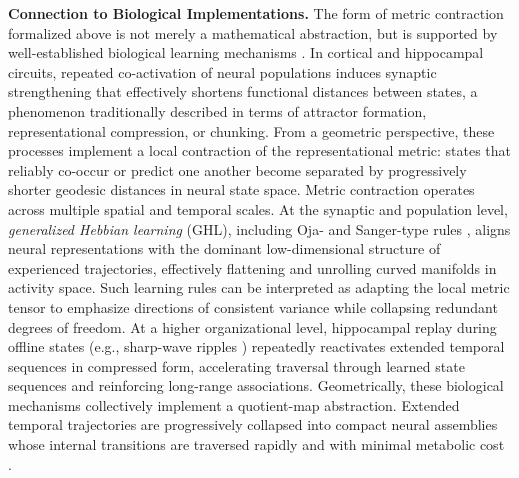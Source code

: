 \documentclass{article}
\begin{document}
\noindent\textbf{Connection to Biological Implementations.}
The form of metric contraction formalized above is not merely a mathematical abstraction, but is supported by well-established biological learning mechanisms \cite{muller1996hippocampus,buzsaki2013memory}.
In cortical and hippocampal circuits, repeated co-activation of neural populations induces synaptic strengthening that effectively shortens functional distances between states, a phenomenon traditionally described in terms of attractor formation, representational compression, or chunking.
From a geometric perspective, these processes implement a local contraction of the representational metric: states that reliably co-occur or predict one another become separated by progressively shorter geodesic distances in neural state space.
Metric contraction operates across multiple spatial and temporal scales.
At the synaptic and population level, \emph{generalized Hebbian learning} (GHL), including Oja- and Sanger-type rules \cite{oja1982simplified,sanger1989optimal}, aligns neural representations with the dominant low-dimensional structure of experienced trajectories, effectively flattening and unrolling curved manifolds in activity space.
Such learning rules can be interpreted as adapting the local metric tensor to emphasize directions of consistent variance while collapsing redundant degrees of freedom.
At a higher organizational level, hippocampal replay during offline states (e.g., sharp-wave ripples \cite{wilson1994reactivation}) repeatedly reactivates extended temporal sequences in compressed form, accelerating traversal through learned state sequences and reinforcing long-range associations.
Geometrically, these biological mechanisms collectively implement a quotient-map abstraction.
Extended temporal trajectories are progressively collapsed into compact neural assemblies whose internal transitions are traversed rapidly and with minimal metabolic cost \cite{hasson2015hierarchical}.
 
\end{document}
